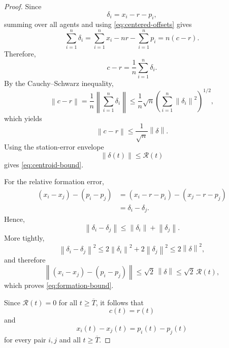 \documentclass[11pt,a4paper]{article}
\theoremstyle{remark}
\newcommand{\norm}[1]{\left\lVert#1\right\rVert}
\newcommand{\env}{\mathcal R}
\begin{document}
\begin{proof}
Since
\begin{equation}
\delta_i=x_i-r-p_i,
\end{equation}
summing over all agents and using \eqref{eq:centered-offsets} gives
\begin{equation}
\sum_{i=1}^{n}\delta_i
=
\sum_{i=1}^{n}x_i
-
nr
-
\sum_{i=1}^{n}p_i
=
n(c-r).
\end{equation}
Therefore,
\begin{equation}
c-r
=
\frac1n\sum_{i=1}^{n}\delta_i.
\end{equation}
By the Cauchy--Schwarz inequality,
\begin{equation}
\norm{c-r}
=
\frac1n
\norm{\sum_{i=1}^{n}\delta_i}
\le
\frac1n
\sqrt{n}
\left(
\sum_{i=1}^{n}\norm{\delta_i}^2
\right)^{1/2},
\end{equation}
which yields
\begin{equation}
\norm{c-r}
\le
\frac{1}{\sqrt n}\norm{\delta}.
\end{equation}
Using the station-error envelope
\begin{equation}
\norm{\delta(t)}\le\env(t)
\end{equation}
gives \eqref{eq:centroid-bound}.

For the relative formation error,
\begin{align}
(x_i-x_j)-(p_i-p_j)
&=
(x_i-r-p_i)-(x_j-r-p_j)\\
&=
\delta_i-\delta_j.
\end{align}
Hence,
\begin{equation}
\norm{\delta_i-\delta_j}
\le
\norm{\delta_i}+\norm{\delta_j}.
\end{equation}
More tightly,
\begin{equation}
\norm{\delta_i-\delta_j}^2
\le
2\norm{\delta_i}^2
+
2\norm{\delta_j}^2
\le
2\norm{\delta}^2,
\end{equation}
and therefore
\begin{equation}
\norm{(x_i-x_j)-(p_i-p_j)}
\le
\sqrt2\,\norm{\delta}
\le
\sqrt2\,\env(t),
\end{equation}
which proves \eqref{eq:formation-bound}.

Since $\env(t)=0$ for all $t\ge\overline T$, it follows that
\begin{equation}
c(t)=r(t)
\end{equation}
and
\begin{equation}
x_i(t)-x_j(t)=p_i(t)-p_j(t)
\end{equation}
for every pair $i,j$ and all $t\ge\overline T$.
\end{proof}
\end{document}
